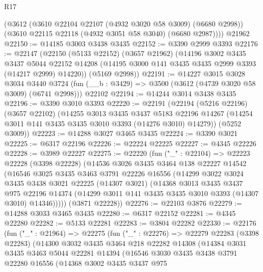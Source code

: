 \begin{lexlean}{R17}
\begin{coremodule}
      (@3612
        (@3610 @22104 @22107 (@4932 @3020 @58 @3009) (@6680 @2998))
        (@3610 @22115 @22118 (@4932 @3051 @58 @3040) (@6680 @2987))))
    @21962
@22150 := @14185 @3003 @3438 @3435
@22152 := @3390 @2999 @3393
@22176 := @22147
    (@22150
      (@5133 @22152)
      (@3657 @21962)
      (@14196
        @3002
        @3435
        @3437
        @5044
        @22152
        @14208
        (@14195 @3000 @141 @3435 @3435 @2999 @3393 (@14217 @2999) @14220))
      (@5169 @2998))
@22191 := @14227
    @3015
    @3028
    @3034
    @3440
    @3724
    (fun (__b : @3429) => @3500 (@3612 (@4739 @3020 @58 @3009) (@6741 @2998)))
    @22102
@22194 := @14244 @3014 @3438 @3435
@22196 := @3390 @3010 @3393
@22220 := @22191
    (@22194
      (@5216 @22196)
      (@3657 @22102)
      (@14255
        @3013
        @3435
        @3437
        @5183
        @22196
        @14267
        (@14254 @3011 @141 @3435 @3435 @3010 @3393 (@14276 @3010) @14279))
      (@5252 @3009))
@22223 := @14288 @3027 @3465 @3435
@22224 := @3390 @3021
@22225 := @6317 @22196
@22226 := @22224 @22225
@22227 := @4345 @22226
@22228 := @3989 @22227
@22275 := @22220
    (fun ("_" : @22104) =>
    @22223
      @22228
      (@3398 @22228)
      (@14536
        @3026
        @3435
        @3464
        @138
        @22227
        @14542
        (@16546
          @3025
          @3435
          @3463
          @3791
          @22226
          @16556
          (@14299
            @3022
            @3024
            @3435
            @3438
            @3021
            @22225
            (@14307 @3021)
            (@14368
              @3013
              @3435
              @3437
              @975
              @22196
              @14374
              (@14299 @3011 @141 @3435 @3435 @3010 @3393 (@14307 @3010) @14346)))))
      (@3871 @22228))
@22276 := @22103 @3876
@22279 := @14288 @3033 @3465 @3435
@22280 := @6317 @22152
@22281 := @4345 @22280
@22282 := @5133 @22281
@22283 := @3804 @22282
@22330 := @22176
    (fun ("_" : @21964) =>
    @22275
      (fun ("_" : @22276) =>
      @22279
        @22283
        (@3398 @22283)
        (@14300
          @3032
          @3435
          @3464
          @218
          @22282
          @14308
          (@14384
            @3031
            @3435
            @3463
            @5044
            @22281
            @14394
            (@16546
              @3030
              @3435
              @3438
              @3791
              @22280
              @16556
              (@14368
                @3002
                @3435
                @3437
                @975

\end{coremodule}
\end{lexlean}
